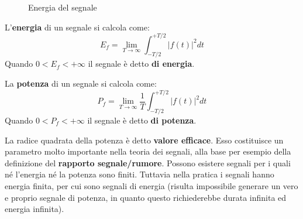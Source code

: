 \documentclass[a4paper, titlepage, oneside]{scrbook}
\begin{document}
\begin{figure}[h]
	\centering
	\caption{Energia del segnale}
	\label{fig:energia_segnale}
\end{figure}

L'\textbf{energia} di un segnale si calcola come:
$$
	E_{f} = \lim_{T\rightarrow\infty} \int_{-T/2}^{+T/2}|f(t)|^2dt
$$
Quando $0<E_{f}<+\infty$ il segnale è detto \textbf{di energia}.

La \textbf{potenza} di un segnale si calcola come:
$$
	P_{f} = \lim_{T\rightarrow\infty} \frac{1}{T} \int_{-T/2}^{+T/2}|f(t)|^2dt
$$
Quando $0<P_{f}<+\infty$ il segnale è detto \textbf{di potenza}.

La radice quadrata della potenza è detto \textbf{valore efficace}. Esso costituisce un parametro molto importante nella teoria dei segnali, alla base per esempio della definizione del \textbf{rapporto segnale/rumore}.
Possono esistere segnali per i quali né l'energia né la potenza sono finiti. Tuttavia nella pratica i segnali hanno energia finita, per cui sono segnali di energia 
(risulta impossibile generare un vero e proprio segnale di potenza, in quanto questo richiederebbe durata infinita ed energia infinita).
\end{document}
